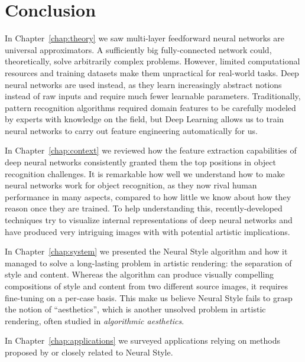 
\chapter{Conclusion}
\label{chap:conclusion}




In Chapter~\ref{chap:theory} we saw multi-layer feedforward neural networks are universal approximators.
A sufficiently big fully-connected network could, theoretically, solve arbitrarily complex problems.
However, limited computational resources and training datasets make them unpractical for real-world tasks.
Deep neural networks are used instead, as they learn increasingly abstract notions instead of raw inputs and require much fewer learnable parameters.
Traditionally, pattern recognition algorithms required domain features to be carefully modeled by experts with knowledge on the field, but Deep Learning allows us to train neural networks to carry out feature engineering automatically for us.

In Chapter~\ref{chap:context} we reviewed how the feature extraction capabilities of deep neural networks consistently granted them the top positions in object recognition challenges.
It is remarkable how well we understand how to make neural networks work for object recognition, as they now rival human performance in many aspects, compared to how little we know about how they reason once they are trained.
To help understanding this, recently-developed techniques try to visualize internal representations of deep neural networks and have produced very intriguing images with with potential artistic implications.

In Chapter~\ref{chap:system} we presented the Neural Style algorithm and how it managed to solve a long-lasting problem in artistic rendering: the separation of style and content.
Whereas the algorithm can produce visually compelling compositions of style and content from two different source images, it requires fine-tuning on a per-case basis.
This make us believe Neural Style fails to grasp the notion of ``aesthetics'', which is another unsolved problem in artistic rendering, often studied in \emph{algorithmic aesthetics}.

In Chapter~\ref{chap:applications} we surveyed applications relying on methods proposed by or closely related to Neural Style.

